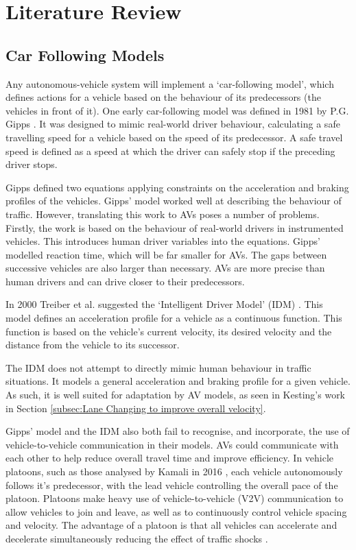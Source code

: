 \chapter{Literature Review}
\label{cha:Literature Review}

\section{Car Following Models}
\label{sec:Car Following Models}
Any autonomous-vehicle system will implement a `car-following model', which defines actions for a vehicle based on the behaviour of its predecessors (the vehicles in front of it). One early car-following model was defined in 1981 by P.G. Gipps \citep{Gipps1981}. It was designed to mimic real-world driver behaviour, calculating a safe travelling speed for a vehicle based on the speed of its predecessor. A safe travel speed is defined as a speed at which the driver can safely stop if the preceding driver stops.

Gipps defined two equations applying constraints on the acceleration and braking profiles of the vehicles. Gipps' model worked well at describing the behaviour of traffic. However, translating this work to AVs poses a number of problems. Firstly, the work is based on the behaviour of real-world drivers in instrumented vehicles. This introduces human driver variables into the equations. Gipps' modelled reaction time, which will be far smaller for AVs. The gaps between successive vehicles are also larger than necessary. AVs are more precise than human drivers and can drive closer to their predecessors.

In 2000 Treiber et al. suggested the `Intelligent Driver Model' (IDM) \citep{Treiber2000}. This model defines an acceleration profile for a vehicle as a continuous function. This function is based on the vehicle's current velocity, its desired velocity and the distance from the vehicle to its successor.

The IDM does not attempt to directly mimic human behaviour in traffic situations. It models a general acceleration and braking profile for a given vehicle. As such, it is well suited for adaptation by AV models, as seen in Kesting's work \citep{Kesting2007} in Section \ref{subsec:Lane Changing to improve overall velocity}.

Gipps' model and the IDM also both fail to recognise, and incorporate, the use of vehicle-to-vehicle communication in their models. AVs could communicate with each other to help reduce overall travel time and improve efficiency. In vehicle platoons, such as those analysed by Kamali in 2016 \citep{Kamali2016}, each vehicle autonomously follows it's predecessor, with the lead vehicle controlling the overall pace of the platoon. Platoons make heavy use of vehicle-to-vehicle (V2V) communication to allow vehicles to join and leave, as well as to continuously control vehicle spacing and velocity. The advantage of a platoon is that all vehicles can accelerate and decelerate simultaneously reducing the effect of traffic shocks \citep{Daganzo1994}.

